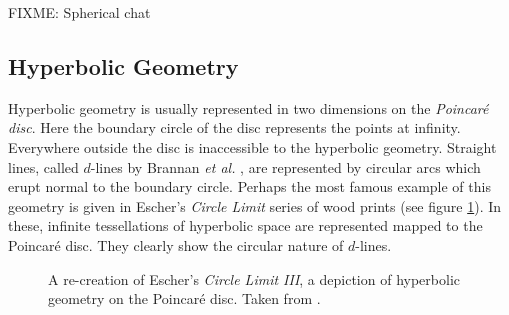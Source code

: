 FIXME: Spherical chat

\subsection{Hyperbolic Geometry}

Hyperbolic geometry is usually represented in two dimensions on the
\emph{Poincar\'e disc}. Here the boundary circle of the disc represents
the points at infinity. Everywhere outside the disc is inaccessible to
the hyperbolic geometry. Straight lines, called $d$-lines by Brannan
\emph{et al.} \cite{GEOM:brannan}, are represented by circular arcs which erupt 
normal to the boundary circle. Perhaps the most famous example of this
geometry is given in Escher's \emph{Circle Limit} series of wood
prints (see figure \ref{fig:circlelimit}). In these, infinite tessellations
of hyperbolic space are represented mapped to the Poincar\'e disc. They
clearly show the circular nature of $d$-lines.

\begin{figure} \centering
{}
\caption{A re-creation of Escher's \emph{Circle Limit III}, 
a depiction of hyperbolic geometry on the Poincar\'e disc.
Taken from \cite{transhyp}.}
\label{fig:circlelimit}
\end{figure}


